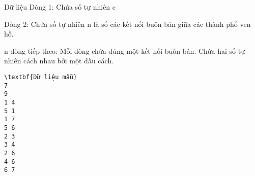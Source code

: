 Dữ liệu
Dòng 1: Chứa số tự nhiên c  

   Dòng  2:   Chứa số tự nhiên n là số các kết nối buôn bán giữa các thành phố ven hồ.  

   n dòng tiếp theo:   Mỗi dòng chứa đúng một kết nối buôn bán. Chứa hai số tự nhiên cách nhau bởi một dấu cách.  
\begin{verbatim}
\textbf{Dữ liệu mẫu}
7
9
1 4
5 1
1 7
5 6
2 3
3 4
2 6
4 6
6 7
\end{verbatim}